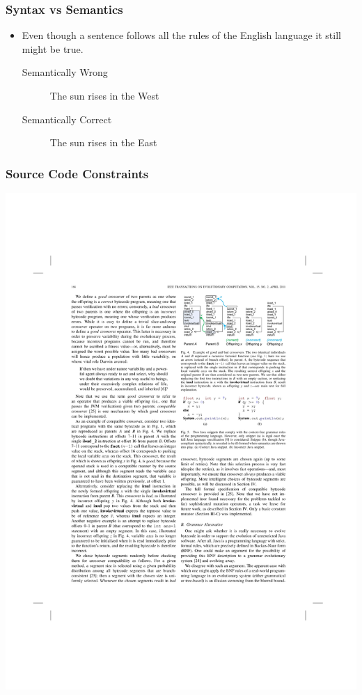 \documentclass{beamer}
\begin{document}
\begin{frame}
	\frametitle{Syntax vs Semantics}
\begin{itemize}
\item Even though a sentence follows all the rules of the English language it still might be true.
	\\
\begin{description}

\item[Semantically Wrong] The sun rises in the West  
\item[Semantically Correct] The sun rises in the East
\end{description}
\end{itemize}

\end{frame}


\begin{frame}
	\frametitle{Source Code Constraints}
   \includegraphics[width=1\textwidth]{Illustrations/semantics.pdf}
       \\
\end{frame}
\end{document}
